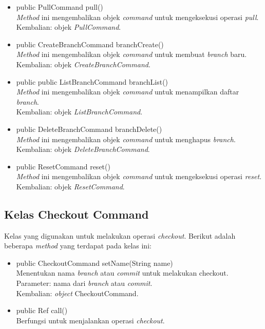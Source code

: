\begin{itemize}
\item public PullCommand pull()\\
\textit{Method} ini mengembalikan objek \textit{command} untuk mengeksekusi operasi \textit{pull}.\\
Kembalian: objek \textit{PullCommand}.

\item public CreateBranchCommand branchCreate()\\
\textit{Method} ini mengembalikan objek \textit{command} untuk membuat \textit{branch} baru.\\
Kembalian: objek \textit{CreateBranchCommand}.

\item public public ListBranchCommand branchList()\\
\textit{Method} ini mengembalikan objek \textit{command} untuk menampilkan daftar \textit{branch}.\\
Kembalian: objek \textit{ListBranchCommand}.

\item public DeleteBranchCommand branchDelete()\\
\textit{Method} ini mengembalikan objek \textit{command} untuk menghapus \textit{branch}.\\
Kembalian: objek \textit{DeleteBranchCommand}.

\item public ResetCommand reset()\\
\textit{Method} ini mengembalikan objek \textit{command} untuk mengeksekusi operasi \textit{reset}.\\
Kembalian: objek \textit{ResetCommand}.
\end{itemize}

\subsection{Kelas Checkout Command}
\label{subsec:checkoutcommand}
Kelas yang digunakan untuk melakukan operasi \textit{checkout}.
Berikut adalah beberapa \textit{method} yang terdapat pada kelas ini:
\begin{itemize}
\item public CheckoutCommand setName(String name)\\
Menentukan nama  \textit{branch} atau \textit{commit} untuk melakukan checkout.\\
Parameter: nama dari \textit{branch} atau \textit{commit}.\\
Kembalian: \textit{object} CheckoutCommand.
\item public Ref call()\\
Berfungsi untuk menjalankan operasi \textit{checkout}.
\end{itemize}

